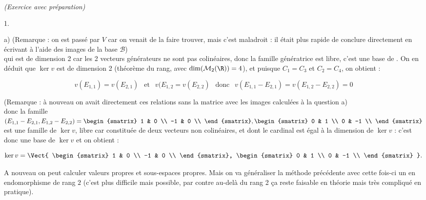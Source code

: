 \documentclass[11pt]{article}%
\begin{document}
\begin{exercice}{\it (Exercice avec préparation)}
\begin{noliste}{1.}
\begin{noliste}{a)}
 (Remarque : on est passé par $V$ car on venait de la faire trouver,
mais c'est maladroit : il était plus rapide de conclure directement en
écrivant  à l'aide des images de la base $\mathcal{B}$) \\

 qui est de dimension 2 car les 2 vecteurs générateurs ne sont pas
colinéaires, donc la famille génératrice est libre, c'est une base de
. On en déduit que $\ker v$ est de dimension 2 (théorème du rang,
avec $\dim ( \mathcal{M}_{2} (\R) ) = 4$), et puisque $C_{1} = C_{3}$
et $C_{2} = C_{4}$, on obtient : 
 
\[
 v ( E_{1,1} ) = v ( E_{2,1} ) \ \ \text{ et } \ \ v ( E_{1,2} = v (
E_{2,2} ) \ \ \text{ donc } \ \ v ( E_{ 1,1 } - E_{2,1} ) = v ( E_{1,2
} - E_{ 2,2 } ) = 0 
\]

 (Remarque : à nouveau on avait directement ces relations sans la
matrice avec les images calculées à la question a) \\

 donc la famille $( E_{ 1,1 } - E_{2,1}, E_{1,2 } - E_{ 2,2 } ) = {
\begin{smatrix}
1 & 0 \\
-1 & 0 \\
\end{smatrix}, \begin{smatrix}
0 & 1 \\
0 & -1 \\
\end{smatrix}
}$ est une famille de $\ker v$, libre car constituée de deux vecteurs
non colinéaires, et dont le cardinal est égal à la dimension de $\ker
v$ : c'est donc une base de $\ker v$ et on obtient : 
 
\[
 \ker v = \Vect { \begin{smatrix}
1 & 0 \\
-1 & 0 \\
\end{smatrix}, \begin{smatrix}
0 & 1 \\
0 & -1 \\
\end{smatrix}
}. 
\]

 \item A nouveau on peut calculer valeurs propres et sous-espaces
propres. Mais on va généraliser la méthode précédente avec cette
fois-ci un en endomorphisme de rang $2$ (c'est plus difficile mais
possible, par contre au-delà du rang 2 ça reste faisable en théorie
mais très compliqué en pratique). \\


\end{noliste}
\end{noliste}
\end{exercice}
\end{document}
